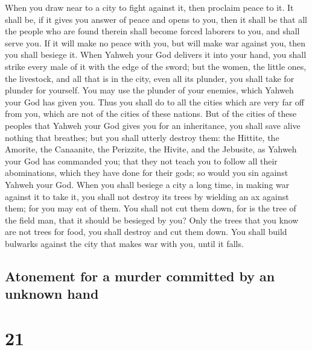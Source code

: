  When you draw near to a city to fight against it, then
proclaim peace to it.  It shall be, if it gives you
answer of peace and opens to you, then it shall be that all the people
who are found therein shall become forced laborers to you, and shall
serve you.  If it will make no peace with you, but will
make war against you, then you shall besiege it.  When
Yahweh your God delivers it into your hand, you shall strike every male
of it with the edge of the sword;  but the women, the
little ones, the livestock, and all that is in the city, even all its
plunder, you shall take for plunder for yourself. You may use the
plunder of your enemies, which Yahweh your God has given you.
 Thus you shall do to all the cities which are very far
off from you, which are not of the cities of these nations.
 But of the cities of these peoples that Yahweh your God
gives you for an inheritance, you shall save alive nothing that
breathes;  but you shall utterly destroy them: the
Hittite, the Amorite, the Canaanite, the Perizzite, the Hivite, and the
Jebusite, as Yahweh your God has commanded you;  that
they not teach you to follow all their abominations, which they have
done for their gods; so would you sin against Yahweh your God.
 When you shall besiege a city a long time, in making war
against it to take it, you shall not destroy its trees by wielding an ax
against them; for you may eat of them. You shall not cut them down, for
is the tree of the field man, that it should be besieged by you?
 Only the trees that you know are not trees for food, you
shall destroy and cut them down. You shall build bulwarks against the
city that makes war with you, until it falls.

\hypertarget{atonement-for-a-murder-committed-by-an-unknown-hand}{%
\subsection{Atonement for a murder committed by an unknown
hand}\label{atonement-for-a-murder-committed-by-an-unknown-hand}}

\hypertarget{section-20}{%
\section{21}\label{section-20}}

